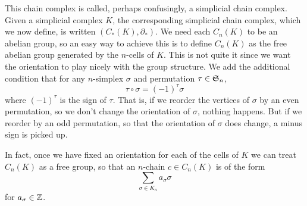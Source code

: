 \documentclass[../main.tex]{subfiles}
\begin{document}
This chain complex is called, perhaps confusingly, a simplicial chain complex. Given a
simplicial complex \( K \), the corresponding simplicial chain complex, which we now
define, is written \( (C_\ast(K), \partial_\ast) \). We need each \( C_n(K) \) to be an
abelian group, so an easy way to achieve this is to define \( C_n(K) \) as the free
abelian group generated by the \( n \)-cells of \( K \). This is not quite it since we
want the orientation to play nicely with the group structure. We add the additional
condition that for any \( n \)-simplex \( \sigma \) and permutation \( \tau \in \S_n \),
\begin{equation*}
	\tau \circ \sigma = (-1)^\tau \sigma
\end{equation*}
where \( (-1)^\tau \) is the sign of \( \tau \). That is, if we reorder the vertices of \(
\sigma \) by an even permutation, so we don't change the orientation of \( \sigma \),
nothing happens. But if we reorder by an odd permutation, so that the orientation of \(
\sigma \) does change, a minus sign is picked up. 

In fact, once we have fixed an orientation for each of the cells of \( K \) we can
treat \( C_n(K) \) as a free group, so that an \( n \)-chain \( c \in C_n(K) \) is of the
form
\begin{equation*}
	\sum_{\sigma \in K_n} a_\sigma \sigma
\end{equation*}
for \( a_\sigma \in \Z \). 
\end{document}
